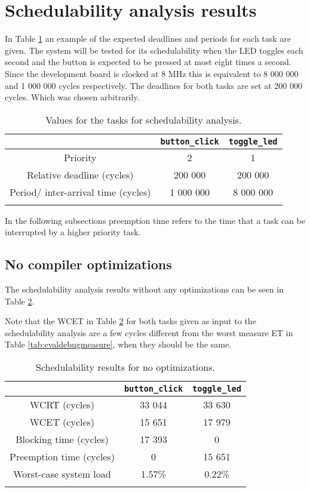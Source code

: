 \section{Schedulability analysis results}
In Table \ref{tab:evalschedtasks} an example of the expected deadlines and
periods for each task are given. The system will be tested for its
schedulability when the LED toggles each second and the button is expected to
be pressed at most eight times a second. Since the development board is clocked
at 8 MHz this is equivalent to 8 000 000 and 1 000 000 cycles respectively. The
deadlines for both tasks are set at 200 000 cycles. Which was chosen
arbitrarily.

\begin{longtable}{|c | c | c|}
    \hline
     & \texttt{button\_click} & \texttt{toggle\_led} \\
    \hline
    Priority & 2 & 1 \\
    \hline
    Relative deadline (cycles) & 200 000 & 200 000 \\
    \hline
    Period/ inter-arrival time (cycles) & 1 000 000 & 8 000 000 \\
    \hline
\caption{Values for the tasks for schedulability analysis.}
\label{tab:evalschedtasks}
\end{longtable}

In the following subsections preemption time refers to the time that
a task can be interrupted by a higher priority task.

\subsection{No compiler optimizations}
The schedulability analysis results without any optimizations can be seen in
Table \ref{tab:evalscheddebug}.

Note that the WCET in Table \ref{tab:evalscheddebug} for both tasks given as input
to the schedulability analysis are a few cycles different from the worst measure
ET in Table \ref{tab:evaldebugmeasure}, when they should be the same.

\begin{longtable}{|c | c | c|}
    \hline
     & \texttt{button\_click} & \texttt{toggle\_led} \\
    \hline
    WCRT (cycles) & 33 044 & 33 630 \\
    \hline
    WCET (cycles) & 15 651 & 17 979 \\
    \hline
    Blocking time (cycles) & 17 393 & 0 \\
    \hline
    Preemption time (cycles) & 0 & 15 651 \\
    \hline
    Worst-case system load & 1.57\% & 0.22\% \\
    \hline
\caption{Schedulability results for no optimizations.}
\label{tab:evalscheddebug}
\end{longtable}

